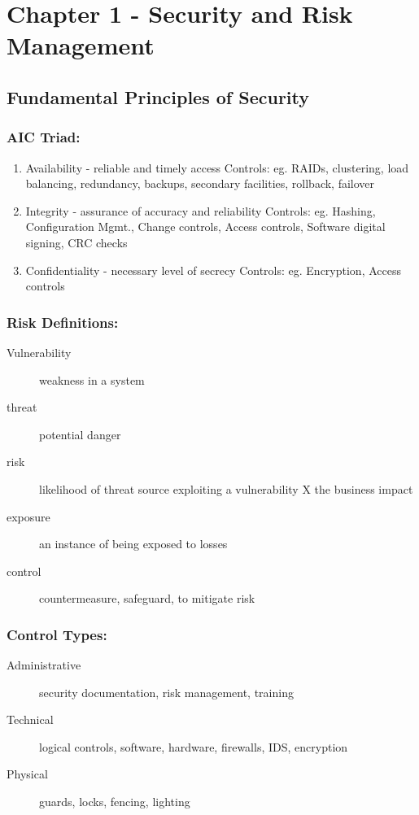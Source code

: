 \documentclass[11pt]{article}
\author{Chris Roberts}
\date{\today}
\title{}
\begin{document}
\tableofcontents



\section{Chapter 1 - Security and Risk Management}
\label{sec:orgb4836a6}
\subsection{Fundamental Principles of Security}
\label{sec:org550102b}
\subsubsection{AIC Triad:}
\label{sec:orgcd94517}
\begin{enumerate}
\item Availability - reliable and timely access
\label{sec:orgbf6d9a9}
Controls: eg. RAIDs, clustering, load balancing, redundancy, backups, secondary facilities, rollback, failover
\item Integrity - assurance of accuracy and reliability
\label{sec:org2e28ef1}
Controls: eg. Hashing, Configuration Mgmt., Change controls, Access controls, Software digital signing, CRC checks
\item Confidentiality - necessary level of secrecy
\label{sec:org4622e3a}
Controls: eg. Encryption, Access controls
\end{enumerate}
\subsubsection{Risk Definitions:}
\label{sec:org86fd8d2}
\begin{description}
\item[{Vulnerability}] weakness in a system
\item[{threat}] potential danger
\item[{risk}] likelihood of threat source exploiting a vulnerability X the business impact
\item[{exposure}] an instance of being exposed to losses
\item[{control}] countermeasure, safeguard, to mitigate risk
\end{description}
\subsubsection{Control Types:}
\label{sec:org099054b}
\begin{description}
\item[{Administrative}] security documentation, risk management, training
\item[{Technical}] logical controls, software, hardware, firewalls, IDS, encryption
\item[{Physical}] guards, locks, fencing, lighting
\end{description}
\end{document}
